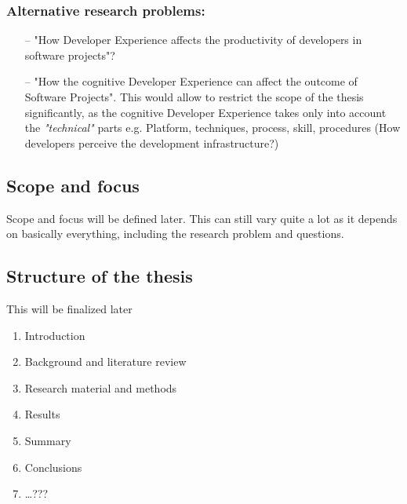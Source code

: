 \documentclass[english, 12pt, a4paper, sci, utf8, a-1b, online]{aaltothesis}
\begin{document}
\subsubsection{Alternative research problems:}

\begin{enumerate}
  \item [--] "How Developer Experience affects the productivity of developers in software projects"?
  \item [--] "How the cognitive Developer Experience can affect the outcome of Software Projects". This would allow to restrict the scope of the thesis significantly, as the cognitive Developer Experience takes only into account the \textit{"technical"} parts e.g. Platform, techniques, process, skill, procedures (How developers perceive the development infrastructure?) \cite{fagerholm-dx-concept-and-definition}
\end{enumerate}

\subsection{Scope and focus}

{
  \color{gray} Scope and focus will be defined later. This can still vary quite a lot as it depends on basically everything, including the research problem and questions.
}

\subsection{Structure of the thesis}
{
  \color{gray} This will be finalized later
}
\begin{enumerate}
  \item Introduction
  \item Background and literature review
  \item Research material and methods
  \item Results
  \item Summary
  \item Conclusions
  \item \dots ???
\end{enumerate}

\clearpage
\end{document}
